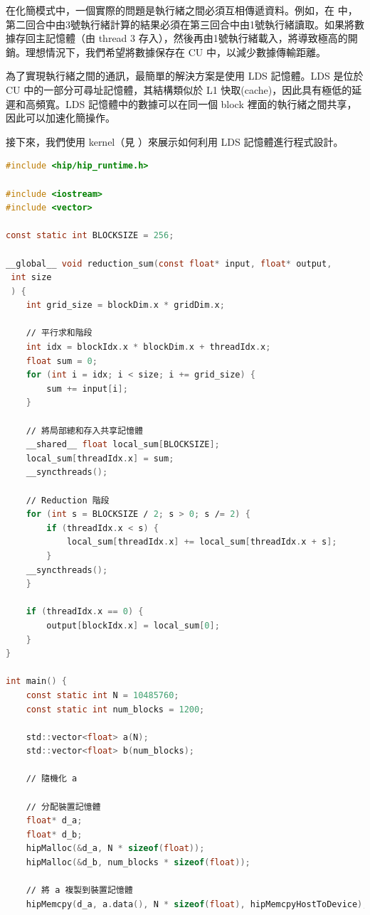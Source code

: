 在化簡模式中，一個實際的問題是執行緒之間必須互相傳遞資料。例如，在   中，第二回合中由3號執行緒計算的結果必須在第三回合中由1號執行緒讀取。如果將數據存回主記憶體（由 thread 3 存入），然後再由1號執行緒載入，將導致極高的開銷。理想情況下，我們希望將數據保存在 CU 中，以減少數據傳輸距離。

為了實現執行緒之間的通訊，最簡單的解決方案是使用 LDS 記憶體。LDS 是位於 CU 中的一部分可尋址記憶體，其結構類似於 L1 快取(cache)，因此具有極低的延遲和高頻寬。LDS 記憶體中的數據可以在同一個 block 裡面的執行緒之間共享，因此可以加速化簡操作。

接下來，我們使用  kernel（見 ）來展示如何利用 LDS 記憶體進行程式設計。

\begin{lstlisting}[language=C, caption={用 HIP 實作的程式，用於計算陣列中數字的總和。}, captionpos=t, label={lst:sum}]
#include <hip∕hip_runtime.h>

#include <iostream>
#include <vector>

const static int BLOCKSIZE = 256;

__global__ void reduction_sum(const float* input, float* output, 
 int size
 ) {
    int grid_size = blockDim.x * gridDim.x;

    ∕∕ 平行求和階段
    int idx = blockIdx.x * blockDim.x + threadIdx.x;
    float sum = 0;
    for (int i = idx; i < size; i += grid_size) {
        sum += input[i];
    }

    ∕∕ 將局部總和存入共享記憶體
    __shared__ float local_sum[BLOCKSIZE];
    local_sum[threadIdx.x] = sum;
    __syncthreads();

    ∕∕ Reduction 階段
    for (int s = BLOCKSIZE ∕ 2; s > 0; s ∕= 2) {
        if (threadIdx.x < s) {
            local_sum[threadIdx.x] += local_sum[threadIdx.x + s];
        }
    __syncthreads();
    }

    if (threadIdx.x == 0) {
        output[blockIdx.x] = local_sum[0];
    }
}

int main() {
    const static int N = 10485760;
    const static int num_blocks = 1200;

    std::vector<float> a(N);
    std::vector<float> b(num_blocks);

    ∕∕ 隨機化 a

    ∕∕ 分配裝置記憶體
    float* d_a;
    float* d_b;
    hipMalloc(&d_a, N * sizeof(float));
    hipMalloc(&d_b, num_blocks * sizeof(float));

    ∕∕ 將 a 複製到裝置記憶體
    hipMemcpy(d_a, a.data(), N * sizeof(float), hipMemcpyHostToDevice);


\end{lstlisting}
